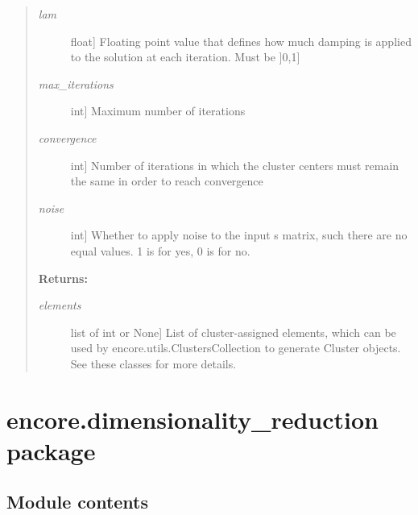 \documentclass[letterpaper,10pt,english]{sphinxmanual}
\begin{document}
\begin{fulllineitems}
\begin{quote}
\begin{description}
\item[{\emph{lam}}] \leavevmode{[}float{]}
Floating point value that defines how much damping is applied to the solution at each iteration. Must be {]}0,1{]}

\item[{\emph{max\_iterations}}] \leavevmode{[}int{]}
Maximum number of iterations

\item[{\emph{convergence}}] \leavevmode{[}int{]}
Number of iterations in which the cluster centers must remain the same in order to reach convergence

\item[{\emph{noise}}] \leavevmode{[}int{]}
Whether to apply noise to the input s matrix, such there are no equal values. 1 is for yes, 0 is for no.

\end{description}

\textbf{Returns:}
\begin{description}
\item[{\emph{elements}}] \leavevmode{[}list of int or None{]}
List of cluster-assigned elements, which can be used by encore.utils.ClustersCollection to generate Cluster objects. See these classes for more details.

\end{description}
\end{quote}

\end{fulllineitems}



\chapter{encore.dimensionality\_reduction package}
\label{index:encore-dimensionality-reduction-package}

\section{Module contents}
\label{index:module-contents}\label{index:module-encore.dimensionality_reduction}\label{index:module-encore.dimensionality_reduction.stochasticproxembed}
\end{document}
